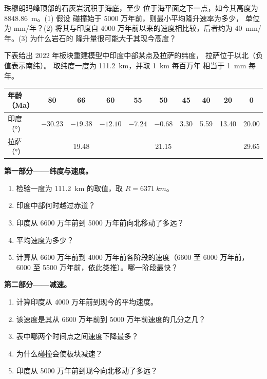 \begin{exercise}[$\star\star\star$]\label{exo:g12:mountain-building:15}
珠穆朗玛峰顶部的石灰岩沉积于海底，至少
位于海平面之下一点，如今其高度为 \qty{8848.86}{m}。(1) 假设
碰撞始于 5000 万年前，则最小平均隆升速率为多少，
单位为 \unit{mm}/年？(2) 将其与印度自
4000 万年前以来的速度相比较，后者约为 \qty{40}{mm}/年。(3) 为什么岩石的
隆升量很可能大于其现今高度？
\end{exercise}

\begin{problem}
\label{pb:g12:mountain-building:1}
下表给出 2022 年板块重建模型中印度中部某点及拉萨的纬度，
拉萨位于以北（负值表示南纬）。
取纬度一度为 \qty{111.2}{km}，并取 \qty{1}{km} 每百万年
相当于 \qty{1}{mm} 每年。

\begin{center}
\small
\begin{tabular}{|l|c|c|c|c|c|c|c|c|c|}
\hline
年龄（\unit{Ma}） & 80 & 66 & 60 & 55 & 50 & 45 & 40 & 20 & 0 \\ \hline
印度（\unit{\degree}） & $-30.23$ & $-19.38$ & $-12.10$ & $-7.24$ & $-0.68$ & 3.30 & 5.59 & 13.40 & 20.00 \\ \hline
拉萨（\unit{\degree}） & & 19.48 & & & 21.15 & & & & 29.65 \\ \hline
\end{tabular}
\end{center}

\medskip
\noindent\textbf{第一部分——纬度与速度。}
\begin{enumerate}
  \item 检验一度为 \qty{111.2}{km} 的取值，取 $R =
        \qty{6371}{km}$。
  \item 印度中部何时越过赤道？
  \item 印度从 6600 万年前到 5000 万年前向北移动了多远？
  \item 平均速度为多少？
  \item 计算从 6600 万年前到 4000 万年前各阶段的速度（6600
        至 6000 万年前，6000 至 5500 万年前，依此类推）。哪一阶段最快？
\end{enumerate}

\medskip
\noindent\textbf{第二部分——减速。}
\begin{enumerate}[resume]
  \item 计算印度从 4000 万年前到现今的平均速度。
  \item 该速度是其从 6600 万年前到 5000 万年前速度的几分之几？
  \item 表中哪两个时间点之间速度下降最多？
  \item 为什么碰撞会使板块减速？
  \item 印度从 5000 万年前到现今向北移动了多远？
\end{enumerate}


\end{problem}
